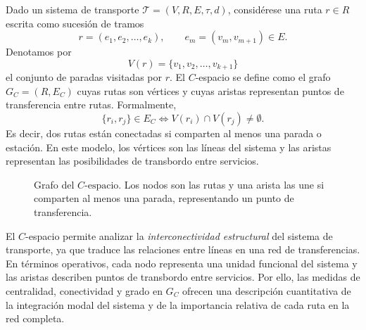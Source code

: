                 \begin{definicion}[$C$-espacio]
                    Dado un sistema de transporte $\mathcal{T} = (V, R, E, \tau, d)$, considérese una ruta $r\in R$ escrita como sucesión de tramos
                    \[
                        r=(e_1,e_2,\ldots,e_k),
                        \qquad e_m=(v_m,v_{m+1})\in E.
                    \]
                    Denotamos por
                    \[
                        V(r)=\{v_1,v_2,\ldots,v_{k+1}\}
                    \]
                    el conjunto de paradas visitadas por $r$. El $C$-espacio se define como el grafo $G_C=(R,E_C)$ cuyas rutas son vértices y cuyas aristas representan puntos de transferencia entre rutas. Formalmente,
                    $$
                        \{r_i,r_j\}\in E_C \iff V(r_i)\cap V(r_j)\neq\emptyset.
                    $$
                    Es decir, dos rutas están conectadas si comparten al menos una parada o estación. En este modelo, los vértices son las líneas del sistema y las aristas representan las posibilidades de transbordo entre servicios.
                \end{definicion}

                \begin{figure}[H]
                    \centering
                    \caption{Grafo del $C\text{-espacio}$. Los nodos son las rutas y una arista las une si comparten al menos una parada, representando un punto de transferencia.}
                    \label{fig:c_espacio}
                \end{figure}

                El $C$-espacio permite analizar la \textit{interconectividad estructural} del sistema de transporte, ya que traduce las relaciones entre líneas en una red de transferencias. En términos operativos, cada nodo representa una unidad funcional del sistema y las aristas describen puntos de transbordo entre servicios. Por ello, las medidas de centralidad, conectividad y grado en $G_C$ ofrecen una descripción cuantitativa de la integración modal del sistema y de la importancia relativa de cada ruta en la red completa.


